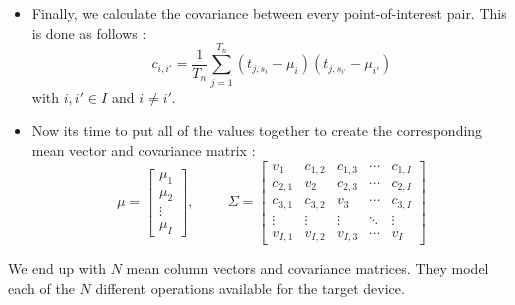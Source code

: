 \begin{itemize}
	\item Finally, we calculate the covariance between every point-of-interest pair. This is done as follows \cite{rechberger2004practical}:
	\begin{equation*}
	c_{i, i'} = \frac{1}{T_n} \sum_{j = 1}^{T_n} ( t_{j, s_i} - \mu_i) ( t_{j, s_{i'}} - \mu_{i'})
	\end{equation*}
	with $i, i' \in I$ and $i \neq i'$.
	\item Now its time to put all of the values together to create the corresponding mean vector and covariance matrix \cite{whisperer2018template}:
	\begin{equation*}
	\mu =
	\begin{bmatrix}
	\mu_1 \\
	\mu_2 \\
	\vdots \\
	\mu_I
	\end{bmatrix}
	, \hspace{1cm}
	\Sigma = 
	\begin{bmatrix}
	v_1 & c_{1, 2} & c_{1, 3} & \dotsm & c_{1, I} \\
	c_{2, 1} & v_2 & c_{2, 3} & \dotsm & c_{2, I} \\
	c_{3, 1} & c_{3, 2}  & v_3 & \dotsm & c_{3, I} \\
	\vdots & \vdots & \vdots & \ddots & \vdots \\
	v_{I, 1} & v_{I, 2} & v_{I, 3} & \dotsm & v_I
	\end{bmatrix}
	\end{equation*}
\end{itemize}
%
We end up with $N$ mean column vectors and covariance matrices.
They model each of the $N$ different operations available for the target device.

